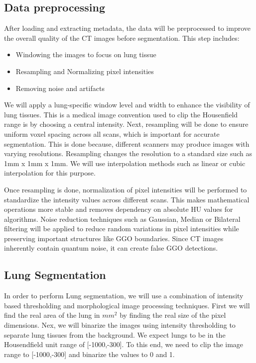 \subsection{Data preprocessing}
After loading and extracting metadata, the data will be preprocessed to improve the overall quality of the CT images before segmentation.
This step includes:
\begin{itemize}
    \item Windowing the images to focus on lung tissue
    \item Resampling and Normalizing pixel intensities
    \item Removing noise and artifacts
\end{itemize}

We will apply a lung-specific window level and width to enhance the visibility of lung tissues. This is a medical image convention
used to clip the Housenfield range is by choosing a central intensity. Next, resampling will be
done to ensure uniform voxel spacing across all scans, which is important for accurate segmentation. This is done because, different scanners
may produce images with varying resolutions. Resampling changes the resolution to a standard size such as 1mm x 1mm x 1mm.
We will use interpolation methods such as linear or cubic interpolation for this purpose.

Once resampling is done, normalization of pixel intensities will be performed to standardize the intensity values across different
scans. This makes mathematical operations more stable and removes dependency on absolute HU values for algorithms.
Noise reduction techniques such as Gaussian, Median or Bilateral filtering will be applied to reduce random variations in pixel intensities
while preserving important structures like GGO boundaries. Since CT images inherently contain quantum noise, it can create false GGO detections.

\subsection{Lung Segmentation}
In order to perform Lung segmentation, we will use a combination of intensity based thresholding and morphological image processing techniques.
First we will find the real area of the lung in $mm^2$ by finding the real size of the pixel dimensions. Nex, we will binarize the
images using intensity thresholding to separate lung tissues from the background. We expect lungs to be in the Housendfield unit
range of [-1000,-300]. To this end, we need to clip the image range to [-1000,-300] and binarize the values to 0 and 1.

